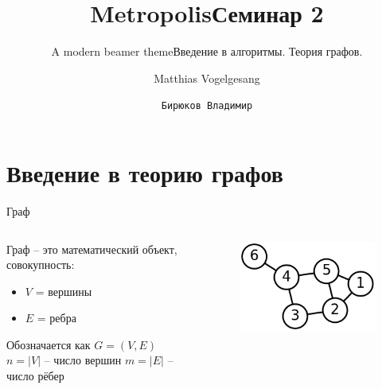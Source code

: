 \documentclass[10pt]{beamer}
\title{Metropolis}
\subtitle{A modern beamer theme}
\date{}
\author{Matthias Vogelgesang}
\institute{Center for modern beamer themes}
\title{Семинар 2}
\subtitle{Введение в алгоритмы. Теория графов.}
\author{\texttt{Бирюков Владимир}}
\institute{МФТИ}
\begin{document}
%
%

\maketitle


%
%

\section{Введение в теорию графов}



\begin{frame}{Граф}
\begin{columns}
\begin{column}{.48\linewidth}
Граф -- это математический объект, совокупность:
\begin{itemize}
\item $V$ = вершины
\item $E$ = ребра
\end{itemize}
Обозначается как $G = (V, E)$ \\
$n = |V|$ -- число вершин
$m = |E|$ -- число рёбер
\end{column}
\begin{column}{.48\linewidth}
		\begin{figure}
		\centerline{\includegraphics[width=1.0\linewidth]{images/graph1.png}}
		\end{figure}
	\end{column}
\end{columns}
\end{frame}
\end{document}
